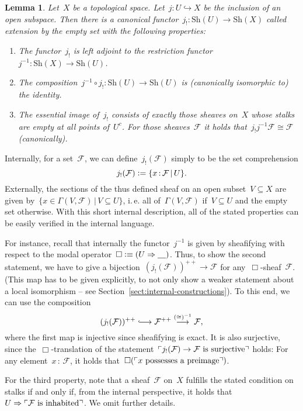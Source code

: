 \documentclass[10pt,reqno,a4paper]{amsbook}
\makeatletter
\theoremstyle{definition}
\theoremstyle{plain}
\newtheorem{lemma}[defn]{Lemma}
\theoremstyle{remark}
\newcommand{\F}{\mathcal{F}}
\newcommand{\placeholder}{\underline{\quad}}
\newcommand{\Sh}{\mathrm{Sh}}
\newcommand{\?}{\,{:}\,}
\renewcommand{\_}{\mathpunct{.}\,}
\newcommand{\speak}[1]{\ulcorner\text{\textnormal{#1}}\urcorner}
\newcommand{\lra}{\longrightarrow}
\newcommand{\lhra}{\ensuremath{\lhook\joinrel\relbar\joinrel\rightarrow}}
\newcommand{\ie}{i.\,e.\@\xspace}
\newcommand{\defeq}{\vcentcolon=}
\newcommand{\defequiv}{\vcentcolon\equiv}
\renewenvironment{proof}[1][\proofname]{\par
  \pushQED{\qed}%
  \normalfont \topsep6\p@\@plus6\p@\relax
  \trivlist
  \item[\hskip\labelsep
        \itshape
    #1\@addpunct{.}]\ignorespaces
}{%
  \popQED\endtrivlist\@endpefalse
}
\makeatother
\begin{document}
\begin{lemma}\label{lemma:extension-by-empty-set}
Let~$X$ be a topological space. Let~$j : U \hookrightarrow X$ be the inclusion
of an open subspace. Then there is a canonical functor~$j_! : \Sh(U) \to
\Sh(X)$ called \emph{extension by the empty set} with the following properties:
\begin{enumerate}
\item The functor~$j_!$ is left adjoint to the restriction functor~$j^{-1} : \Sh(X) \to
\Sh(U)$.
\item The composition~$j^{-1} \circ j_! : \Sh(U) \to \Sh(U)$ is (canonically
isomorphic to) the identity.
\item The essential image of~$j_!$ consists of exactly those sheaves on~$X$
whose stalks are empty at all points of~$U^c$. For those sheaves~$\F$ it holds
that~$j_!j^{-1}\F \cong \F$ (canonically).
\end{enumerate}
\end{lemma}
\begin{proof}Internally, for a set~$\F$, we can define~$j_!(\F)$ simply to be the
set comprehension
\[ j_!(\F) \defeq \{ x\?\F \,|\, U \}. \]
Externally, the sections of the thus defined sheaf on an open subset~$V
\subseteq X$ are given by~$\{ x \in \Gamma(V,\F) \,|\, V \subseteq U \}$,
\ie all of~$\Gamma(V,\F)$ if~$V \subseteq U$ and the empty set otherwise.
With this short internal description, all of the stated properties can be
easily verified in the internal language.

For instance, recall that internally the functor~$j^{-1}$ is given by
sheafifying with respect to the modal operator~$\Box \defequiv (U \Rightarrow
\placeholder)$. Thus, to show the second statement, we have to give a
bijection~$(j_!(\F))^{++} \to \F$ for any~$\Box$-sheaf~$\F$. (This map has to
be given explicitly, to not only show a weaker statement about a local
isomorphism -- see Section~\ref{sect:internal-constructions}). To this end, we can use the composition
\[ (j_!(\F))^{++} \lhra \F^{++} \stackrel{({\cong})^{-1}}{\lra} \F, \]
where the first map is injective since sheafifying is exact. It is also
surjective, since the~$\Box$-translation of the statement~$\speak{$j_!(\F) \to
\F$ is surjective}$ holds: For any element~$x\?\F$, it holds
that~$\Box(\speak{$x$ possesses a preimage})$.

For the third property, note that a sheaf~$\F$ on~$X$ fulfills the stated
condition on stalks if and only if, from the internal perspective, it holds
that~$U \Rightarrow \speak{$\F$ is inhabited}$. We omit further details.
\end{proof}
\end{document}
